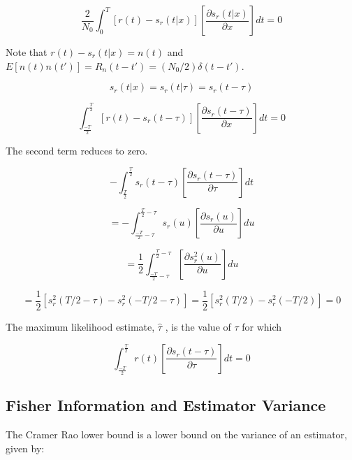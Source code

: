 \documentclass[11pt]{article}
\begin{document}
\begin{equation}
\frac{2}{N_0} \int^T_0 \left[ r(t) - s_r(t|x)\right]
\left[ \frac{\partial s_r(t|x)}{\partial x} \right] dt = 0
\end{equation}

Note that $r(t) - s_r(t|x) = n(t)$ and $E[n(t)n(t')]=R_n(t-t')=(N_0/2)\delta(t-t')$.

\begin{equation}
s_r(t|x) = s_r(t|\tau) = s_r(t-\tau)
\end{equation}


\begin{equation}
\int^\frac{T}{2}_\frac{-T}{2}
 \left[ r(t) - s_r(t-\tau)\right]
\left[ \frac{\partial s_r(t-\tau)}{\partial x} \right] dt = 0
\end{equation}

The second term reduces to zero.

\begin{equation}
- \int^\frac{T}{2}_\frac{T}{2}
s_r(t-\tau)
\left[ \frac{\partial s_r(t-\tau)}{\partial \tau} \right] dt
\end{equation}


\begin{equation}
=-\int^{\frac{T}{2}-\tau}_{\frac{-T}{2}-\tau}
s_r(u)
\left[ \frac{\partial s_r(u)}{\partial u} \right] du
\end{equation}

\begin{equation}
=\frac{1}{2} \int^{\frac{T}{2}-\tau}_{\frac{-T}{2}-\tau}
\left[ \frac{\partial s_r^2(u)}{\partial u} \right] du
\end{equation}

\begin{equation}
=\frac{1}{2}[s_r^2(T/2-\tau) - s_r^2(-T/2-\tau)] = \frac{1}{2}[s_r^2(T/2) - s_r^2(-T/2)] = 0
\end{equation}

The maximum likelihood estimate, $\hat{\tau}$ , is the value of $\tau$ for which

\begin{equation}
\int^\frac{T}{2}_\frac{-T}{2}
r(t)
\left[ \frac{\partial s_r(t-\tau)}{\partial \tau} \right] dt = 0
\end{equation}


\subsection{Fisher Information and Estimator Variance}


The Cramer Rao lower bound is a lower bound on the variance of an estimator, given by:
\end{document}

